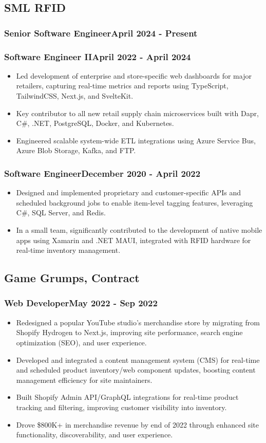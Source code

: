 
\newcommand\jobtitle[2]{
	\subsubsection*{\normalfont#1\hfill\normalfont#2}
}

\newcommand\position[4]{
	\subsection*{#1}
	\jobtitle{#2}{#3}
	#4
	\vspace{-0.25cm}
}


\position{SML RFID}{Senior Software Engineer}{April 2024 - Present}{
	\jobtitle{Software Engineer II}{April 2022 - April 2024}
	\begin{itemize}
		\item Led development of enterprise and store-specific web dashboards for major retailers, capturing real-time metrics and reports using TypeScript, TailwindCSS, Next.js, and SvelteKit.
		\item Key contributor to all new retail supply chain microservices built with Dapr, C\#, .NET, PostgreSQL, Docker, and Kubernetes.
		\item Engineered scalable system-wide ETL integrations using Azure Service Bus, Azure Blob Storage, Kafka, and FTP.
	\end{itemize}

	\jobtitle{Software Engineer}{December 2020 - April 2022}
	\begin{itemize}
		\item Designed and implemented proprietary and customer-specific APIs and scheduled background jobs to enable item-level tagging features, leveraging C\#, SQL Server, and Redis.
		\item In a small team, significantly contributed to the development of native mobile apps using Xamarin and .NET MAUI, integrated with RFID hardware for real-time inventory management.
	\end{itemize}
}

\position{Game Grumps, Contract}{Web Developer}{May 2022 - Sep 2022}{
	\begin{itemize}
		\item Redesigned a popular YouTube studio’s merchandise store by migrating from Shopify Hydrogen to Next.js, improving site performance, search engine optimization (SEO), and user experience.
		\item Developed and integrated a content management system (CMS) for real-time and scheduled product inventory/web component updates, boosting content management efficiency for site maintainers.
		\item Built Shopify Admin API/GraphQL integrations for real-time product tracking and filtering, improving customer visibility into inventory.
		\item Drove \$800K+ in merchandise revenue by end of 2022 through enhanced site functionality, discoverability, and user experience.
	\end{itemize}
}

